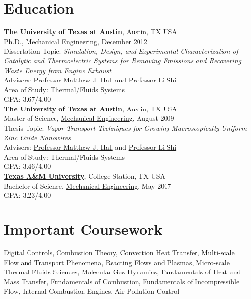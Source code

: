\documentclass[centered]{res}
\begin{document}
\begin{resume}
\section{Education}
%
\href{http://www.utexas.edu/}{\textbf{The University of Texas at
    Austin}}, Austin, TX USA \\
Ph.D., \href{http://www.me.utexas.edu/}{Mechanical Engineering},
December 2012 \\
Dissertation Topic: \emph{Simulation, Design, and Experimental Characterization of
  Catalytic and Thermoelectric Systems for Removing Emissions and
  Recovering Waste Energy from Engine Exhaust} \\
Advisers:
\href{http://www.me.utexas.edu/directory/faculty/hall/matthew/33/}{Professor
  Matthew J. Hall} and \href{http://www.me.utexas.edu/~lishi/}{Professor Li Shi}\\
Area of Study: Thermal/Fluids Systems \\
GPA: 3.67/4.00 \\
%
\href{http://www.utexas.edu/}{\textbf{The University of Texas at
    Austin}}, Austin, TX USA \\
Master of Science, \href{http://www.me.utexas.edu/}{Mechanical
  Engineering}, August 2009 \\
Thesis Topic: \emph{Vapor Transport Techniques for Growing
  Macroscopically Uniform Zinc Oxide Nanowires} \\
Advisers:
\href{http://www.me.utexas.edu/directory/faculty/hall/matthew/33/}{Professor
  Matthew J. Hall} and \href{http://www.me.utexas.edu/~lishi/}{Professor Li Shi}\\
Area of Study: Thermal/Fluids Systems \\
GPA: 3.46/4.00\\
%
\href{http://www.tamu.edu/}{\textbf{Texas A\&M University}}, College
Station, TX USA \\
Bachelor of Science, \href{http://www.mengr.tamu.edu/}{Mechanical
  Engineering}, May
2007  \\
GPA: 3.23/4.00

\section{Important Coursework}
Digital Controls, Combustion Theory, Convection Heat Transfer,
Multi-scale Flow and Transport Phenomena, Reacting Flows and Plasmas,
Micro-scale Thermal Fluids Sciences, Molecular Gas Dynamics,
Fundamentals of Heat and Mass Transfer, Fundamentals of Combustion,
Fundamentals of Incompressible Flow, Internal Combustion Engines, Air
Pollution Control
 

\end{resume}
\end{document}
